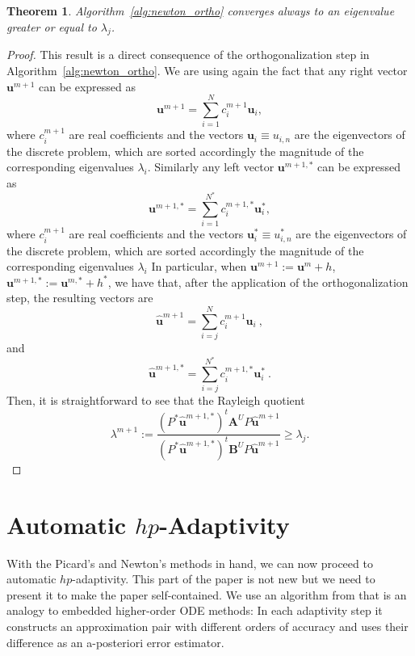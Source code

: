 \documentclass[preprint,12pt]{elsarticle}
\newtheorem{theorem}{Theorem}[section]
\begin{document}
\begin{theorem}
Algorithm~\ref{alg:newton_ortho} converges always to an eigenvalue greater or equal to $\lambda_j$.
\end{theorem}

\begin{proof}
This result is a direct consequence of the orthogonalization step in Algorithm~\ref{alg:newton_ortho}.
We are using again the fact that any right vector $\mathbf{u}^{m+1}$ can be expressed as 
$$
\mathbf{u}^{m+1}=\sum_{i=1}^N c_i^{m+1} \mathbf{u}_i,
$$
where $c_i^{m+1}$ are real coefficients  and the vectors $\mathbf{u}_i\equiv u_{i,n}$ are the eigenvectors of the discrete problem, which are sorted accordingly the magnitude of the corresponding eigenvalues $\lambda_i$.
Similarly any left vector $\mathbf{u}^{m+1,*}$ can be expressed as 
$$
\mathbf{u}^{m+1,*}=\sum_{i=1}^{N^*} c_i^{m+1,*} \mathbf{u}_i^*,
$$
where $c_i^{m+1}$ are real coefficients and the vectors $\mathbf{u}_i^*\equiv u_{i,n}^*$ are the eigenvectors of the discrete problem, which are sorted accordingly the magnitude of the corresponding eigenvalues $\lambda_i$
In particular, when $\mathbf{u}^{m+1}:=\mathbf{u}^m+h$, $\mathbf{u}^{m+1,*}:=\mathbf{u}^{m,*}+h^*$, we have that, after the application of the orthogonalization step, the resulting vectors are
$$
\mathbf{\hat u}^{m+1}=\sum_{i=j}^N c_i^{m+1} \mathbf{u}_i\ ,
$$
and 
$$
\mathbf{\hat u}^{m+1,*}=\sum_{i=j}^{N^*} c_i^{m+1,*} \mathbf{u}_i^* \ .
$$
Then, it is straightforward to see that the Rayleigh quotient
$$
\displaystyle\lambda^{m+1}:=\frac{(P^*\mathbf{\hat u}^{m+1,*})^t\mathbf{A}^U P\mathbf{\hat u}^{m+1}}{(P^*\mathbf{\hat u}^{m+1,*})^t\mathbf{B}^U P\mathbf{\hat u}^{m+1}} \ge \lambda_j.
$$
\end{proof}



\section{Automatic $hp$-Adaptivity}\label{sec:adapt}


With the Picard's and Newton's methods in hand, we can now proceed to automatic $hp$-adaptivity.
This part of the paper is not new but we need to present it to make the paper self-contained.
We use an algorithm from \cite{solin3} that is an analogy to embedded higher-order ODE methods: 
In each adaptivity step it 
constructs an approximation pair with different orders of accuracy and uses their difference 
as an a-posteriori error estimator. 
\end{document}
